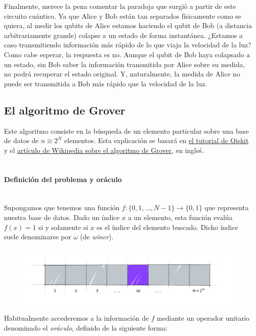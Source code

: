 \documentclass[11pt]{article}
\newcommand{\myparagraph}[1]{\paragraph*{ \\ #1}\mbox{}\\}
\theoremstyle{plain}
\begin{document}
Finalmente, merece la pena comentar la paradoja que surgió a partir de este circuito cuántico. Ya que Alice y Bob están tan separados físicamente como se quiera, al medir los qubits de Alice estamos haciendo el qubit de Bob (a distancia arbitrariamente grande) colapse a un estado de forma instantánea. ¿Estamos a caso transmitiendo información más rápido de lo que viaja la velocidad de la luz? \\

Como cabe esperar, la respuesta es no. Aunque el qubit de Bob haya colapsado a un estado, sin Bob saber la información transmitida por Alice sobre su medida, no podrá recuperar el estado original. Y, naturalmente, la medida de Alice no puede ser transmitida a Bob más 
rápido que la velocidad de la luz.


\subsection{El algoritmo de Grover}

Este algoritmo consiste en la búsqueda de un elemento particular sobre una base de datos de $ n \equiv 2^N$ elementos. Esta explicación se basará en \href{https://qiskit.org/textbook/ch-algorithms/grover.html}{el tutorial de Qiskit} y el \href{https://en.wikipedia.org/wiki/Grover\%27s_algorithm}{artículo de Wikipedia sobre el algoritmo de Grover}, en ingleś. \\

\myparagraph{Definición del problema y oráculo}

Supongamos que tenemos una función $f: \{0, 1, \ldots, N-1\} \longrightarrow \{0,1\}$ que representa nuestra base de datos. Dado un índice $x$ a un elemento, esta función evalúa $f(x) = 1$ si y solamente si $x$ es el índice del elemento buscado. Dicho índice suele denominarse por $\omega$ (de \emph{winer}).

\begin{figure}[H]
	\centering
	\includegraphics[scale=0.5]{figures/grover1.png}
\end{figure}

Habitualmente accederemos a la información de $f$ mediante un operador unitario denominado el \emph{oráculo}, definido de la siguiente forma:
\end{document}
